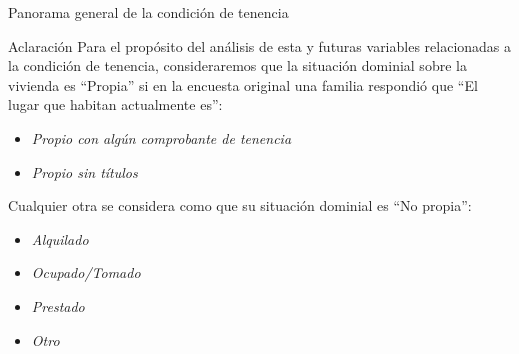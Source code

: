 \documentclass[aspectratio=169]{beamer}
\begin{document}
    \begin{frame}{Panorama general de la condición de tenencia}
        \begin{block}{Aclaración}\pause
            Para el propósito del análisis de esta y futuras variables relacionadas a la condición de tenencia, consideraremos que la situación dominial sobre la vivienda es ``Propia'' si en la encuesta original una familia respondió que ``El lugar que habitan actualmente es'':\pause 
            \begin{itemize}
                \item \textit{Propio con algún comprobante de tenencia}
                \item \textit{Propio sin títulos}
            \end{itemize} \pause
            Cualquier otra se considera como que su situación dominial es ``No propia'': \vspace{-8pt} \pause
            \begin{multicols}{2}
                \begin{itemize}
                    \item \textit{Alquilado}
                    \item \textit{Ocupado/Tomado}
                    \item \textit{Prestado}
                    \item \textit{Otro}
                \end{itemize}
            \end{multicols}\vspace{-8pt}
        \end{block}
    \end{frame}
\end{document}
